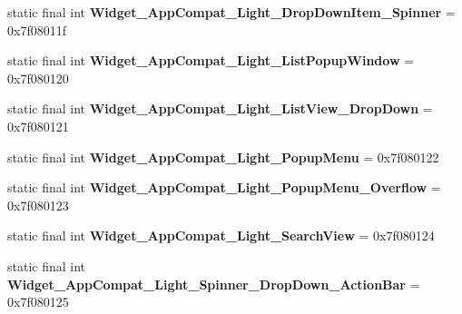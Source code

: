 \begin{DoxyCompactItemize}
\item 
\hypertarget{classandroid_1_1support_1_1design_1_1_r_1_1style_a118bf1b8561a3ae251ed642e8fb9bbeb}{}static final int {\bfseries Widget\+\_\+\+App\+Compat\+\_\+\+Light\+\_\+\+Drop\+Down\+Item\+\_\+\+Spinner} = 0x7f08011f\label{classandroid_1_1support_1_1design_1_1_r_1_1style_a118bf1b8561a3ae251ed642e8fb9bbeb}

\item 
\hypertarget{classandroid_1_1support_1_1design_1_1_r_1_1style_a2822c3939a9985a663bd4bbfb42a5b10}{}static final int {\bfseries Widget\+\_\+\+App\+Compat\+\_\+\+Light\+\_\+\+List\+Popup\+Window} = 0x7f080120\label{classandroid_1_1support_1_1design_1_1_r_1_1style_a2822c3939a9985a663bd4bbfb42a5b10}

\item 
\hypertarget{classandroid_1_1support_1_1design_1_1_r_1_1style_a94e847b19fdbecbf77bcf9270efd3c07}{}static final int {\bfseries Widget\+\_\+\+App\+Compat\+\_\+\+Light\+\_\+\+List\+View\+\_\+\+Drop\+Down} = 0x7f080121\label{classandroid_1_1support_1_1design_1_1_r_1_1style_a94e847b19fdbecbf77bcf9270efd3c07}

\item 
\hypertarget{classandroid_1_1support_1_1design_1_1_r_1_1style_a6de5f5410fa15acb332677f38900251c}{}static final int {\bfseries Widget\+\_\+\+App\+Compat\+\_\+\+Light\+\_\+\+Popup\+Menu} = 0x7f080122\label{classandroid_1_1support_1_1design_1_1_r_1_1style_a6de5f5410fa15acb332677f38900251c}

\item 
\hypertarget{classandroid_1_1support_1_1design_1_1_r_1_1style_ab4760c992c625181f7217741a86bd3f1}{}static final int {\bfseries Widget\+\_\+\+App\+Compat\+\_\+\+Light\+\_\+\+Popup\+Menu\+\_\+\+Overflow} = 0x7f080123\label{classandroid_1_1support_1_1design_1_1_r_1_1style_ab4760c992c625181f7217741a86bd3f1}

\item 
\hypertarget{classandroid_1_1support_1_1design_1_1_r_1_1style_a58e29240634e52dc3816876687bd0209}{}static final int {\bfseries Widget\+\_\+\+App\+Compat\+\_\+\+Light\+\_\+\+Search\+View} = 0x7f080124\label{classandroid_1_1support_1_1design_1_1_r_1_1style_a58e29240634e52dc3816876687bd0209}

\item 
\hypertarget{classandroid_1_1support_1_1design_1_1_r_1_1style_a7a4fe1246deb189632a33f6311618b8e}{}static final int {\bfseries Widget\+\_\+\+App\+Compat\+\_\+\+Light\+\_\+\+Spinner\+\_\+\+Drop\+Down\+\_\+\+Action\+Bar} = 0x7f080125\label{classandroid_1_1support_1_1design_1_1_r_1_1style_a7a4fe1246deb189632a33f6311618b8e}


\end{DoxyCompactItemize}
